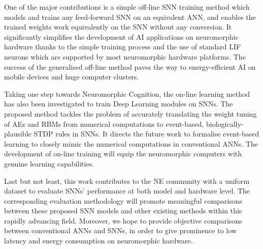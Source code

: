 One of the major contributions is a simple off-line SNN training method which models and trains any feed-forward SNN on an equivalent ANN, and enables the trained weights work equivalently on the SNN without any conversion.
It significantly simplifies the development of AI applications on neuromorphic hardware thanks to the simple training process and the use of standard LIF neurons which are supported by most neuromorphic hardware platforms.
The success of the generalised off-line method paves the way to energy-efficient AI on mobile devices and huge computer clusters.


Taking one step towards Neuromorphic Cognition, the on-line learning method has also been investigated to train Deep Learning modules on SNNs.
The proposed method tackles the problem of accurately translating the weight tuning of AEs and RBMs from numerical computations to event-based, biologically-plausible STDP rules in SNNs.
It directs the future work to formalise event-based learning to closely mimic the numerical computations in conventional ANNs.
The development of on-line training will equip the neuromorphic computers with genuine learning capabilities.

Last but not least, this work contributes to the NE community with a uniform dataset to evaluate SNNs' performance at both model and hardware level.
The corresponding evaluation methodology will promote meaningful comparisons between these proposed SNN models and other existing methods within this rapidly advancing field.
Moreover, we hope to provide objective comparisons between conventional ANNs and SNNs, in order to give prominence to low latency and energy consumption on neuromorphic hardware.

